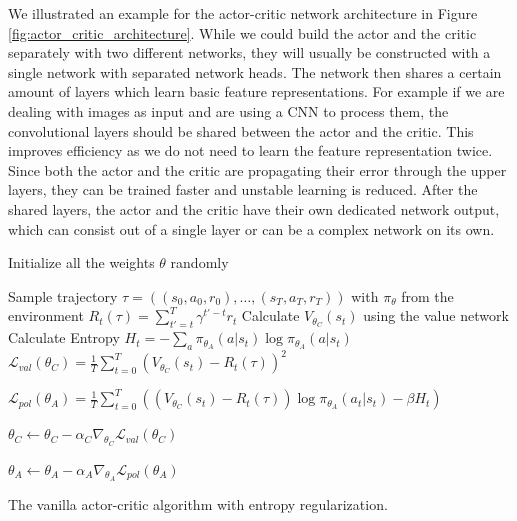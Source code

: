 We illustrated an example for the actor-critic network architecture in Figure \ref{fig:actor_critic_architecture}. While we could build the actor and the critic separately with two different networks, they will usually be constructed with a single network with separated network heads. The network then shares a certain amount of layers which learn basic feature representations. For example if we are dealing with images as input and are using a CNN to process them, the convolutional layers should be shared between the actor and the critic. This improves efficiency as we do not need to learn the feature representation twice. Since both the actor and the critic are propagating their error through the upper layers, they can be trained faster and unstable learning is reduced. After the shared layers, the actor and the critic have their own dedicated network output, which can consist out of a single layer or can be a complex network on its own. 

\begin{algorithm}[ht]
  Initialize all the weights $\theta$ randomly \;
    {
   Sample trajectory $\tau = ((s_0, a_0, r_0), \dots, (s_T, a_T, r_T))$ with $\pi_\theta$ from the environment \;
      {
      $R_t(\tau) = \sum^T_{t'=t} \gamma^{t'-t}r_t$ \;
      Calculate $V_{\theta_C}(s_t)$ using the value network \;
      Calculate Entropy $H_t = - \sum_a \pi_{\theta_A}(a|s_t) \log \pi_{\theta_A}(a|s_t)$
    }
    $\mathcal{L}_{val}(\theta_C) = \frac{1}{T} \sum^T_{t=0}(V_{\theta_C}(s_t) - R_t(\tau))^2$ 

    $\mathcal{L}_{pol}(\theta_A) = \frac{1}{T} \sum^T_{t=0}\left(\left(V_{\theta_C}(s_t)-R_t(\tau)\right) \log \pi_{\theta_A}(a_t|s_t) - \beta H_t\right)$ 

    $\theta_C \leftarrow \theta_C - \alpha_C \nabla_{\theta_C} \mathcal{L}_{val}(\theta_C)$ 
  
    $\theta_A \leftarrow \theta_A - \alpha_A \nabla_{\theta_A} \mathcal{L}_{pol}(\theta_A)$ 

  }

  \caption[The Vanilla Actor-Critic Algorithm]{The vanilla actor-critic algorithm with entropy regularization.}\label{alg:ActorCritic}
 \end{algorithm}

